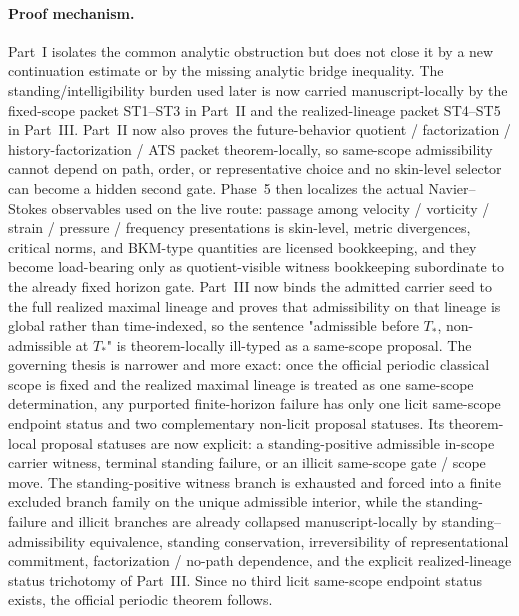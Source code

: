 \paragraph{Proof mechanism.}
Part~I isolates the common analytic obstruction but does not close it by a new continuation estimate or by the missing analytic bridge inequality. The standing/intelligibility burden used later is now carried manuscript-locally by the fixed-scope packet ST1--ST3 in Part~II and the realized-lineage packet ST4--ST5 in Part~III. Part~II now also proves the future-behavior quotient / factorization / history-factorization / ATS packet theorem-locally, so same-scope admissibility cannot depend on path, order, or representative choice and no skin-level selector can become a hidden second gate. Phase~5 then localizes the actual Navier--Stokes observables used on the live route: passage among velocity / vorticity / strain / pressure / frequency presentations is skin-level, metric divergences, critical norms, and BKM-type quantities are licensed bookkeeping, and they become load-bearing only as quotient-visible witness bookkeeping subordinate to the already fixed horizon gate. Part~III now binds the admitted carrier seed to the full realized maximal lineage and proves that admissibility on that lineage is global rather than time-indexed, so the sentence "admissible before $T_*$, non-admissible at $T_*$" is theorem-locally ill-typed as a same-scope proposal. The governing thesis is narrower and more exact: once the official periodic classical scope is fixed and the realized maximal lineage is treated as one same-scope determination, any purported finite-horizon failure has only one licit same-scope endpoint status and two complementary non-licit proposal statuses. Its theorem-local proposal statuses are now explicit: a standing-positive admissible in-scope carrier witness, terminal standing failure, or an illicit same-scope gate / scope move. The standing-positive witness branch is exhausted and forced into a finite excluded branch family on the unique admissible interior, while the standing-failure and illicit branches are already collapsed manuscript-locally by standing--admissibility equivalence, standing conservation, irreversibility of representational commitment, factorization / no-path dependence, and the explicit realized-lineage status trichotomy of Part~III. Since no third licit same-scope endpoint status exists, the official periodic theorem follows.

